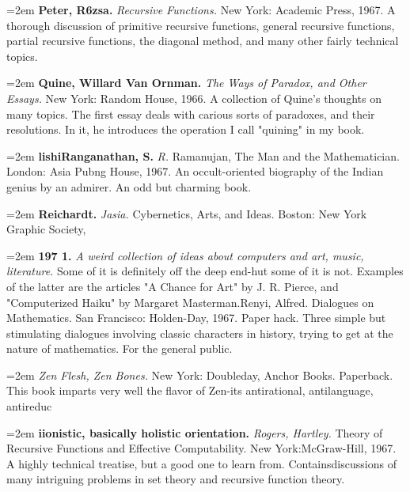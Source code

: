 \par\noindent\hangindent=2em {\bf Peter, R6zsa.} {\it Recursive Functions.} New York: Academic Press, 1967. A thorough discussion of primitive recursive functions, general recursive functions, partial recursive functions, the diagonal method, and many other fairly technical topics.

\par\noindent\hangindent=2em {\bf Quine, Willard Van Ornman.} {\it The Ways of Paradox, and Other Essays.} New York: Random House, 1966. A collection of Quine's thoughts on many topics. The first essay deals with carious sorts of paradoxes, and their resolutions. In it, he introduces the operation I call "quining" in my book.

\par\noindent\hangindent=2em {\bf lishiRanganathan, S.} {\it R.} Ramanujan, The Man and the Mathematician. London: Asia Pubng House, 1967. An occult-oriented biography of the Indian genius by an admirer. An odd but charming book.

\par\noindent\hangindent=2em {\bf Reichardt.} {\it Jasia.} Cybernetics, Arts, and Ideas. Boston: New York Graphic Society,

\par\noindent\hangindent=2em {\bf 197 1.} {\it A weird collection of ideas about computers and art, music, literature.} Some of it is definitely off the deep end-hut some of it is not. Examples of the latter are the articles "A Chance for Art" by J. R. Pierce, and "Computerized Haiku" by Margaret Masterman.Renyi, Alfred. Dialogues on Mathematics. San Francisco: Holden-Day, 1967. Paper hack. Three simple but stimulating dialogues involving classic characters in history, trying to get at the nature of mathematics. For the general public.

\par\noindent\hangindent=2em  {\it Zen Flesh, Zen Bones.} New York: Doubleday, Anchor Books. Paperback. This book imparts very well the flavor of Zen-its antirational, antilanguage, antireduc

\par\noindent\hangindent=2em {\bf iionistic, basically holistic orientation.} {\it Rogers, Hartley.} Theory of Recursive Functions and Effective Computability. New York:McGraw-Hill, 1967. A highly technical treatise, but a good one to learn from. Containsdiscussions of many intriguing problems in set theory and recursive function theory.

